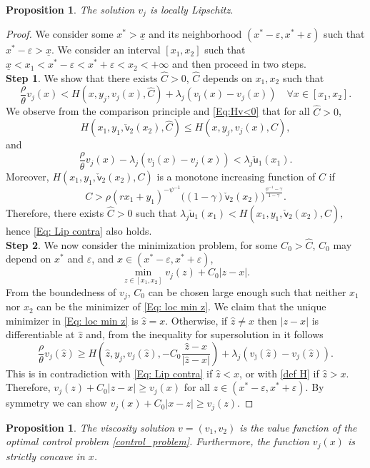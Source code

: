 \documentclass[11pt]{article}
\numberwithin{equation}{section}
\newtheorem{prop}[thm]{Proposition}
\theoremstyle{definition}
\def\su{{\mathsf{u}}}
\def\sv{{\mathsf{v}}}
\newcommand{\eps}{\varepsilon}
\newcommand{\ux}{{\underline x}}
\newcommand{\beq}{\begin{equation}}
\newcommand{\eeq}{\end{equation}}
\newcommand{\g}{\gamma}
\newcommand{\p}{\psi}
\theoremstyle{plain}
\begin{document}
\begin{prop}\label{Prop:Lip}
The solution $v_j$ is locally Lipschitz. 
\end{prop}
\begin{proof}
We consider some $x^*>\ux$ and its neighborhood $(x^*-\eps,x^*+\eps)$ such that $x^*-\eps>\ux$. We consider an interval $[x_1,x_2]$ such that $\ux<x_1<x^*-\eps<x^*+\eps<x_2<+\infty$ and then proceed in two steps. \\
{\bf{Step 1}}. We show that there exists $\hat{C}>0$, $\hat{C}$ depends on $x_1, x_2$ such that
\beq\label{Eq: Lip contra}
\frac{\rho}{\theta} v_j(x)< H(x,y_j,v_j(x),\hat{C})+\lambda_j (v_{\bar \jmath}(x)-v_j(x))\quad \forall x\in [x_1,x_2].
\eeq
We observe from the comparison principle and \eqref{Eq:Hv<0} that for all $\hat{C}>0$,
$$
H(x_1,y_1,\check{\sv}_2(x_2),\hat{C})\leq H(x,y_j,v_j(x),\hat{C}),
$$
and 
$$
\frac{\rho}{\theta} v_j(x)-\lambda_j (v_{\bar \jmath}(x)-v_j(x))< \lambda_j\check{\su}_1(x_1).
$$
Moreover, $H(x_1,y_1,\check{\sv}_2(x_2),C)$ is a monotone increasing function of $C$ if 
$$
C>\rho (rx_1+y_1)^{-\p^{-1}}\big((1-\g)\check{\sv}_2(x_2)\big)^{\frac{\p^{-1}-\g}{1-\g}}.
$$
Therefore, there exists $\hat{C}>0$ such that 
$
\lambda_j\check{\su}_1(x_1)<H(x_1,y_1,\check{\sv}_2(x_2),\hat{C}),
$
hence \eqref{Eq: Lip contra} also holds. \\
{\bf{Step 2}}. We now consider the minimization problem, for some $C_0>\hat{C}$, $C_0$ may depend on $x^*$ and $\eps$, and $x\in (x^*-\eps,x^*+\eps)$,
\beq\label{Eq: loc min z}
\min_{z\in [x_1,x_2]}v_j(z)+C_0\vert z-x\vert.
\eeq
From the boundedness of $v_j$, $C_0$ can be chosen large enough such that {}{neither $x_1$ nor $x_2$ can be the minimizer of \eqref{Eq: loc min z}.} 
We claim that the unique minimizer in \eqref{Eq: loc min z} is $\hat{z}=x$. Otherwise, if $\hat{z}\neq x$ then $\vert z-x\vert$ is differentiable at $\hat{z}$ and, from the inequality for supersolution in  it follows
$$
\frac{\rho}{\theta} v_j(\hat{z})\geq H(\hat{z},y_j,v_j(\hat{z}),-C_0\frac{\hat{z}-x}{\vert \hat{z}-x\vert})+\lambda_j (v_{\bar \jmath}(\hat{z})-v_j(\hat{z})).
$$
This is in contradiction with \eqref{Eq: Lip contra} if $\hat{z}<x$, or with \eqref{def H} if $\hat{z}>x$. Therefore, $v_j(z)+C_0\vert z-x\vert \geq v_j(x)$ for all $z\in (x^*-\eps,x^*+\eps)$. By symmetry we can show $v_j(x)+C_0\vert x-z\vert \geq v_j(z)$.
\end{proof}


\begin{prop}\label{Prop: v concave}
The viscosity solution $v=(v_1,v_2)$ is the value function of the optimal control problem \eqref{control_problem}. Furthermore, the function $v_j(x)$ is strictly concave in $x$.
\end{prop}
\end{document}
